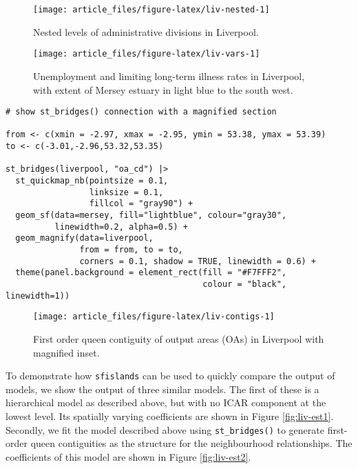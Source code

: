 \begin{figure}

{\centering \texttt{[image: article\_files/figure-latex/liv-nested-1]} 

}

\caption{Nested levels of administrative divisions in Liverpool. }\label{fig:liv-nested}
\end{figure}

\begin{figure}

{\centering \texttt{[image: article\_files/figure-latex/liv-vars-1]} 

}

\caption{Unemployment and limiting long-term illness rates in Liverpool, with extent of Mersey estuary in light blue to the south west. }\label{fig:liv-vars}
\end{figure}

\begin{verbatim}
# show st_bridges() connection with a magnified section

from <- c(xmin = -2.97, xmax = -2.95, ymin = 53.38, ymax = 53.39)
to <- c(-3.01,-2.96,53.32,53.35)

st_bridges(liverpool, "oa_cd") |> 
  st_quickmap_nb(pointsize = 0.1,
                 linksize = 0.1,
                 fillcol = "gray90") +  
  geom_sf(data=mersey, fill="lightblue", colour="gray30", 
          linewidth=0.2, alpha=0.5) + 
  geom_magnify(data=liverpool, 
               from = from, to = to, 
               corners = 0.1, shadow = TRUE, linewidth = 0.6) + 
  theme(panel.background = element_rect(fill = "#F7FFF2",
                                        colour = "black", linewidth=1))
\end{verbatim}

\begin{figure}

{\centering \texttt{[image: article\_files/figure-latex/liv-contigs-1]} 

}

\caption{First order queen contiguity of output areas (OAs) in Liverpool with magnified inset. }\label{fig:liv-contigs}
\end{figure}

To demonstrate how \texttt{sfislands} can be used to quickly compare the output of models, we show the output of three similar models. The first of these is a hierarchical model as described above, but with no ICAR component at the lowest level. Its spatially varying coefficients are shown in Figure \ref{fig:liv-est1}. Secondly, we fit the model described above using \texttt{st\_bridges()} to generate first-order queen contiguities as the structure for the neighbourhood relationships. The coefficients of this model are shown in Figure \ref{fig:liv-est2}.

